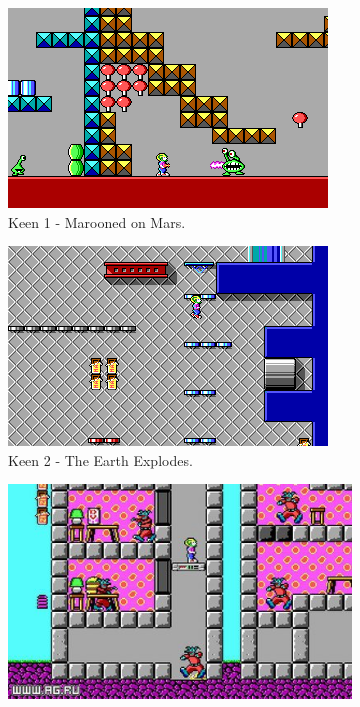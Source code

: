 \documentclass[book.tex]{subfiles}
\begin{document}
\begin{figure}[H]
\begin{subfigure}{.5\textwidth}
  \centering
  \includegraphics[width=.95\textwidth]{screenshots_300dpi/Keen_Marooned_on_Mars_gameplay.png}
  \caption*{Keen 1 - Marooned on Mars.}
\end{subfigure}%
\begin{subfigure}{.5\textwidth}
  \centering
  \includegraphics[width=.95\textwidth]{screenshots_300dpi/keen1_2.png}
  \caption*{Keen 2 - The Earth Explodes.}
\end{subfigure}
\par\bigskip %
\begin{subfigure}{.5\textwidth}
  \centering
  \includegraphics[width=.95\textwidth]{screenshots_300dpi/keen1_3.jpg}

\end{subfigure}
\end{figure}
\end{document}
